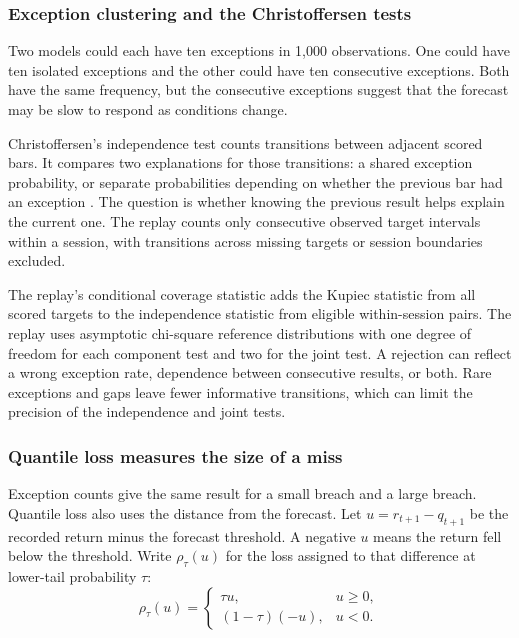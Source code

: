\documentclass[
	12pt,				%
	openright,			%
	twoside,			%
	a4paper,
	chapter=TITLE,
	english				%
	]{abntex2}
\begin{document}
\subsubsection{Exception clustering and the Christoffersen tests}

Two models could each have ten exceptions in 1,000 observations. One could have ten isolated exceptions and the other could have ten consecutive exceptions. Both have the same frequency, but the consecutive exceptions suggest that the forecast may be slow to respond as conditions change.

Christoffersen's independence test counts transitions between adjacent scored bars. It compares two explanations for those transitions: a shared exception probability, or separate probabilities depending on whether the previous bar had an exception \cite{christoffersen-1998}. The question is whether knowing the previous result helps explain the current one. The replay counts only consecutive observed target intervals within a session, with transitions across missing targets or session boundaries excluded.

The replay's conditional coverage statistic adds the Kupiec statistic from all scored targets to the independence statistic from eligible within-session pairs. The replay uses asymptotic chi-square reference distributions with one degree of freedom for each component test and two for the joint test. A rejection can reflect a wrong exception rate, dependence between consecutive results, or both. Rare exceptions and gaps leave fewer informative transitions, which can limit the precision of the independence and joint tests.

\subsubsection{Quantile loss measures the size of a miss}

Exception counts give the same result for a small breach and a large breach. Quantile loss also uses the distance from the forecast. Let $u=r_{t+1}-q_{t+1}$ be the recorded return minus the forecast threshold. A negative $u$ means the return fell below the threshold. Write $\rho_\tau(u)$ for the loss assigned to that difference at lower-tail probability $\tau$:
\begin{equation}
  \rho_\tau(u)=
    \begin{cases}
      \tau u, & u\geq 0,\\
      (1-\tau)(-u), & u<0.
    \end{cases}
  \label{eq:pinball}
\end{equation}
\end{document}
